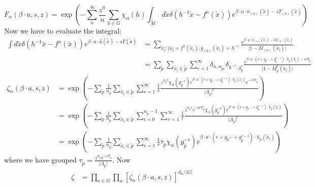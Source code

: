 \begin{description}
\[
F_{\alpha}(\beta\cdot a,s,z)=\exp\left(-\sum_{n}^{\infty}\frac{z^{n}}{n}\sum_{h\in G}\chi_{\alpha}(h)\int_{\mathcal{\tilde{\mathcal{M}}}}d\tilde{x}\delta(h^{-1}\tilde{x}-f^{n}(\tilde{x}))e^{\beta\cdot a\cdot\hat{n}_{(n)}(\tilde{x})-sT_{(n)}(\tilde{x})}\right)
\]
Now we have to evaluate the integral:
\begin{align*}
\int d\tilde{x}\delta(h^{-1}\tilde{x}-f^{n}(\tilde{x}))e^{\beta\cdot a\cdot\hat{n}(\tilde{x})-sT(\tilde{x})} & =\sum_{\tilde{x}_{i}:(\tilde{x}_{i}=f^{n}(\tilde{x}_{i}),g_{(n)}(\tilde{x}_{i})=h^{-1}}\frac{e^{\beta\cdot a\cdot\hat{n}_{(n)}(\tilde{x}_{i})-sT_{(n)}(\tilde{x}_{i})}}{\vert1-M_{(n)}(\tilde{x}_{i})\vert}\\
 & =\sum_{\tilde{p}}\sum_{\tilde{x}_{i}\in\tilde{p}}\sum_{r=1}^{\infty}\delta_{n,n_{\tilde{p}r}}\delta_{h^{-1},g_{\tilde{p}}^{r}}\frac{e^{\beta\cdot a\cdot(e+g_{\tilde{p}}\cdots+g_{\tilde{p}}^{r-1})\cdot\hat{n}_{\tilde{p}}(\tilde{x}_{i})-srT_{\tilde{p}}}}{\vert1-M_{\tilde{p}}^{r}(\tilde{x}_{i})\vert}
\end{align*}
\begin{align*}
\zeta_{\alpha}(\beta\cdot a,s,z) & =\exp\left(-\sum_{\tilde{p}}\frac{1}{n_{\tilde{p}}}\sum_{\tilde{x}_{i}\in\tilde{p}}\sum_{r=1}^{\infty}\frac{1}{r}\frac{z^{n_{\tilde{p}}r}\chi_{\alpha}(g_{\tilde{p}}^{-r})e^{\beta\cdot a\cdot(e+g_{\tilde{p}}\cdots+g_{\tilde{p}}^{r-1})\cdot\hat{n}_{\tilde{p}}(\tilde{x}_{i})}e^{-srT_{\tilde{p}}}}{\vert\Lambda_{\tilde{p}}\vert^{r}}\right)\\
 & =\exp\left(-\sum_{\tilde{p}}\frac{1}{n_{\tilde{p}}}\sum_{\tilde{x}_{i}\in\tilde{p}}\sum_{i=0}^{n_{\tilde{p}}-1}\sum_{r=1}^{\infty}\frac{1}{r}\frac{z^{n_{\tilde{p}}r}e^{-srT_{\tilde{p}}}\chi_{\alpha}(g_{\tilde{p}}^{-r})e^{\beta\cdot a\cdot(e+g_{\tilde{p}}\cdots+g_{\tilde{p}}^{r-1})\cdot\hat{n}_{\tilde{p}}(\tilde{x}_{i})}}{\vert\Lambda_{\tilde{p}}\vert^{r}}\right)\\
 & =\exp\left(-\sum_{\tilde{p}}\frac{1}{n_{\tilde{p}}}\sum_{\tilde{x}_{i}\in\tilde{p}}\sum_{r=1}^{\infty}\frac{1}{r}\tau_{\tilde{p}}\chi_{\alpha}(g_{\tilde{p}}^{-r})e^{\beta\cdot a\cdot(e+g_{\tilde{p}}\cdots+g_{\tilde{p}}^{r-1})\cdot\hat{n}_{\tilde{p}}(\tilde{x}_{i})}\right)
\end{align*}
where we have grouped $\tau_{\tilde{p}}=\frac{z^{n_{\tilde{p}}}e^{-sT_{\tilde{p}}}}{\vert\Lambda_{\tilde{p}}\vert}$.
Now 
\begin{align*}
\zeta & =\prod_{a\in G}\prod_{\alpha}\left[\zeta_{\alpha}(\beta\cdot a,s,z)\right]^{d_{\alpha}/\vert G\vert}\\

\end{align*}
\end{description}
